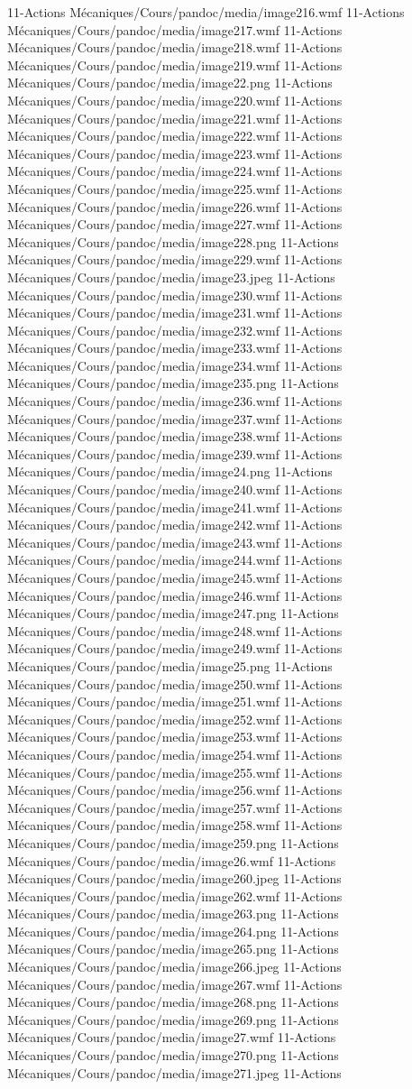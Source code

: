 11-Actions Mécaniques/Cours/pandoc/media/image216.wmf 11-Actions Mécaniques/Cours/pandoc/media/image217.wmf 11-Actions Mécaniques/Cours/pandoc/media/image218.wmf 11-Actions Mécaniques/Cours/pandoc/media/image219.wmf 11-Actions Mécaniques/Cours/pandoc/media/image22.png 11-Actions Mécaniques/Cours/pandoc/media/image220.wmf 11-Actions Mécaniques/Cours/pandoc/media/image221.wmf 11-Actions Mécaniques/Cours/pandoc/media/image222.wmf 11-Actions Mécaniques/Cours/pandoc/media/image223.wmf 11-Actions Mécaniques/Cours/pandoc/media/image224.wmf 11-Actions Mécaniques/Cours/pandoc/media/image225.wmf 11-Actions Mécaniques/Cours/pandoc/media/image226.wmf 11-Actions Mécaniques/Cours/pandoc/media/image227.wmf 11-Actions Mécaniques/Cours/pandoc/media/image228.png 11-Actions Mécaniques/Cours/pandoc/media/image229.wmf 11-Actions Mécaniques/Cours/pandoc/media/image23.jpeg 11-Actions Mécaniques/Cours/pandoc/media/image230.wmf 11-Actions Mécaniques/Cours/pandoc/media/image231.wmf 11-Actions Mécaniques/Cours/pandoc/media/image232.wmf 11-Actions Mécaniques/Cours/pandoc/media/image233.wmf 11-Actions Mécaniques/Cours/pandoc/media/image234.wmf 11-Actions Mécaniques/Cours/pandoc/media/image235.png 11-Actions Mécaniques/Cours/pandoc/media/image236.wmf 11-Actions Mécaniques/Cours/pandoc/media/image237.wmf 11-Actions Mécaniques/Cours/pandoc/media/image238.wmf 11-Actions Mécaniques/Cours/pandoc/media/image239.wmf 11-Actions Mécaniques/Cours/pandoc/media/image24.png 11-Actions Mécaniques/Cours/pandoc/media/image240.wmf 11-Actions Mécaniques/Cours/pandoc/media/image241.wmf 11-Actions Mécaniques/Cours/pandoc/media/image242.wmf 11-Actions Mécaniques/Cours/pandoc/media/image243.wmf 11-Actions Mécaniques/Cours/pandoc/media/image244.wmf 11-Actions Mécaniques/Cours/pandoc/media/image245.wmf 11-Actions Mécaniques/Cours/pandoc/media/image246.wmf 11-Actions Mécaniques/Cours/pandoc/media/image247.png 11-Actions Mécaniques/Cours/pandoc/media/image248.wmf 11-Actions Mécaniques/Cours/pandoc/media/image249.wmf 11-Actions Mécaniques/Cours/pandoc/media/image25.png 11-Actions Mécaniques/Cours/pandoc/media/image250.wmf 11-Actions Mécaniques/Cours/pandoc/media/image251.wmf 11-Actions Mécaniques/Cours/pandoc/media/image252.wmf 11-Actions Mécaniques/Cours/pandoc/media/image253.wmf 11-Actions Mécaniques/Cours/pandoc/media/image254.wmf 11-Actions Mécaniques/Cours/pandoc/media/image255.wmf 11-Actions Mécaniques/Cours/pandoc/media/image256.wmf 11-Actions Mécaniques/Cours/pandoc/media/image257.wmf 11-Actions Mécaniques/Cours/pandoc/media/image258.wmf 11-Actions Mécaniques/Cours/pandoc/media/image259.png 11-Actions Mécaniques/Cours/pandoc/media/image26.wmf 11-Actions Mécaniques/Cours/pandoc/media/image260.jpeg 11-Actions Mécaniques/Cours/pandoc/media/image262.wmf 11-Actions Mécaniques/Cours/pandoc/media/image263.png 11-Actions Mécaniques/Cours/pandoc/media/image264.png 11-Actions Mécaniques/Cours/pandoc/media/image265.png 11-Actions Mécaniques/Cours/pandoc/media/image266.jpeg 11-Actions Mécaniques/Cours/pandoc/media/image267.wmf 11-Actions Mécaniques/Cours/pandoc/media/image268.png 11-Actions Mécaniques/Cours/pandoc/media/image269.png 11-Actions Mécaniques/Cours/pandoc/media/image27.wmf 11-Actions Mécaniques/Cours/pandoc/media/image270.png 11-Actions Mécaniques/Cours/pandoc/media/image271.jpeg 11-Actions 